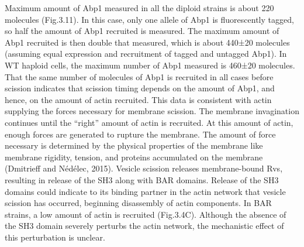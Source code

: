 \documentclass[9pt,lineno]{elife}
\begin{document}
Maximum amount of Abp1 measured in all the diploid strains is about 220 molecules (Fig.3.11). In this case, only one allele of Abp1 is fluorescently tagged, so half the amount of Abp1 recruited is measured. The maximum amount of Abp1 recruited is then double that measured, which is about 440±20 molecules (assuming equal expression and recruitment of tagged and untagged Abp1). In WT haploid cells, the maximum number of Abp1 measured is 460±20 molecules. That the same number of molecules of Abp1 is recruited in all cases before scission indicates that scission timing depends on the amount of Abp1, and hence, on the amount of actin recruited.
This data is consistent with actin supplying the forces necessary for membrane scission. The membrane invagination continues until the “right” amount of actin is recruited. At this amount of actin, enough forces are generated to rupture the membrane. The amount of force necessary is determined by the physical properties of the membrane like membrane rigidity, tension, and proteins accumulated on the membrane (Dmitrieff and Nédélec, 2015). Vesicle scission releases membrane-bound Rvs, resulting in release of the SH3 along with BAR domains. Release of the SH3 domains could indicate to its binding partner in the actin network that vesicle scission has occurred, beginning disassembly of actin components. In BAR strains, a low amount of actin is recruited (Fig.3.4C). Although the absence of the SH3 domain severely perturbs the actin network, the mechanistic effect of this perturbation is unclear.
\end{document}
